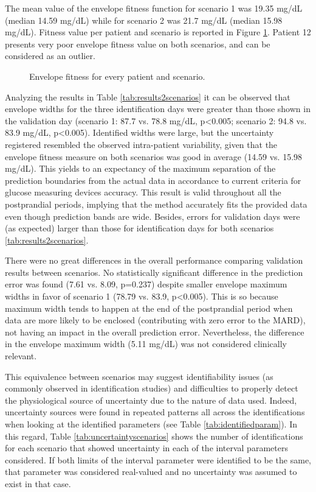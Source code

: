 The mean value of the envelope fitness function for scenario 1 was 19.35 mg/dL (median 14.59 mg/dL) while for scenario 2 was 21.7 mg/dL (median 15.98 mg/dL). Fitness value per patient and scenario is reported in Figure \ref{fig:fitnessperpatient}. Patient 12 presents very poor envelope fitness value on both scenarios, and can be considered as an outlier.

\begin{figure}[hbtp]
\centering
{}\caption{Envelope fitness for every patient and scenario.}
\label{fig:fitnessperpatient}
\end{figure}

Analyzing the results in Table \ref{tab:results2scenarios} it can be observed that envelope widths for the three identification days were greater than those shown in the validation day (scenario 1: 87.7 vs. 78.8 mg/dL, p<0.005; scenario 2: 94.8 vs. 83.9 mg/dL, p<0.005). Identified widths were large, but the uncertainty registered resembled the observed intra-patient variability, given that the envelope fitness measure on both scenarios was good in average (14.59 vs. 15.98 mg/dL). This yields to an expectancy of the maximum separation of the prediction boundaries from the actual data in accordance to current criteria for glucose measuring devices accuracy. This result is valid throughout all the postprandial periods, implying that the method accurately fits the provided data even though prediction bands are wide. Besides, errors for validation days were (as expected) larger than those for identification days for both scenarios \ref{tab:results2scenarios}. 

There were no great differences in the overall performance comparing validation results between scenarios. No statistically significant difference in the prediction error was found (7.61 vs. 8.09, p=0.237) despite smaller envelope maximum widths in favor of scenario 1 (78.79 vs. 83.9, p<0.005). This is so because maximum width tends to happen at the end of the postprandial period when data are more likely to be enclosed (contributing with zero error to the MARD), not having an impact in the overall prediction error. Nevertheless, the difference in the envelope maximum width (5.11 mg/dL) was not considered clinically relevant. 

This equivalence between scenarios may suggest identifiability issues (as commonly observed in identification studies) and difficulties to properly detect the physiological source of uncertainty due to the nature of data used. Indeed, uncertainty sources were found in repeated patterns all across the identifications when looking at the identified parameters (see Table \ref{tab:identifiedparam}). In this regard, Table \ref{tab:uncertaintyscenarios} shows the number of identifications for each scenario that showed uncertainty in each of the interval parameters considered. If both limits of the interval parameter were identified to be the same, that parameter was considered real-valued and no uncertainty was assumed to exist in that case. 

